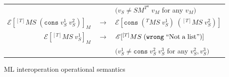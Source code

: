 \begin{figure}
\begin{center}
\begin{tabular}{rcl}
&& $(v_{S}\neq SM^{T^{a}}\;v_{M}$ for any $v_{M})$ \\
$\mathscr{E}[^{[T]}MS\;(\mathtt{cons}\;v_{S}^{1}\;v_{S}^{2})]_{M}$ & $\rightarrow$ & $\mathscr{E}[\mathtt{cons}\;(^{T}MS\;v_{S}^{1})\;(^{[T]}MS\;v_{S}^{2})]$ \\
$\mathscr{E}[^{[T]}MS\;v_{S}^{1}]_{M}$ & $\rightarrow$ & $\mathscr{E}[^{[T]}MS\;(\mathtt{wrong}\;\mathrm{``Not\;a\;list"})]$ \\
&& $(v_{S}^{1}\neq\mathtt{cons}\;v_{S}^{2}\;v_{S}^{3}$ for any $v_{S}^{2},v_{S}^{3})$
\end{tabular}
\end{center}
\caption{ML interoperation operational semantics}
\label{fig:mios}
\end{figure}